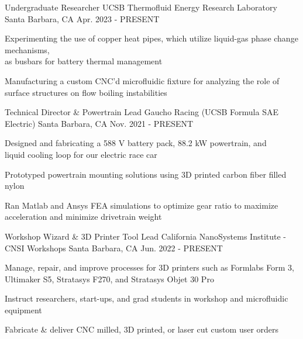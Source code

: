 

\begin{cventries}

\cventry
{Undergraduate Researcher} %
{UCSB Thermofluid Energy Research Laboratory} %
{Santa Barbara, CA} %
{Apr. 2023 - PRESENT} %
{ %
\begin{cvitems}   
\item {Experimenting the use of copper heat pipes, which utilize liquid-gas phase change mechanisms,\\ as busbars for battery thermal management}
\item {Manufacturing a custom CNC'd microfluidic fixture for analyzing the role of surface structures on flow boiling instabilities}
\end{cvitems}
}

\cventry
{Technical Director \& Powertrain Lead} %
{Gaucho Racing (UCSB Formula SAE Electric)} %
{Santa Barbara, CA} %
{Nov. 2021 - PRESENT} %
{ %
\begin{cvitems}   
\item {Designed and fabricating a 588 V battery pack, 88.2 kW powertrain, and \\ liquid cooling loop for our electric race car}
\item {Prototyped powertrain mounting solutions using 3D printed carbon fiber filled nylon}
\item {Ran Matlab and Ansys FEA simulations to optimize gear ratio to maximize acceleration and minimize drivetrain weight}
\end{cvitems}
}


\cventry
{Workshop Wizard \& 3D Printer Tool Lead} %
{California NanoSystems Institute - CNSI Workshops} %
{Santa Barbara, CA} %
{Jun. 2022 - PRESENT} %
{ %
\begin{cvitems}
\item {Manage, repair, and improve processes for 3D printers such as Formlabs Form 3, Ultimaker S5, Stratasys F270, and Stratasys Objet 30 Pro}
\item {Instruct researchers, start-ups, and grad students in workshop and microfluidic equipment}
\item {Fabricate \& deliver CNC milled, 3D printed, or laser cut custom user orders }
\end{cvitems}
}


\end{cventries}
